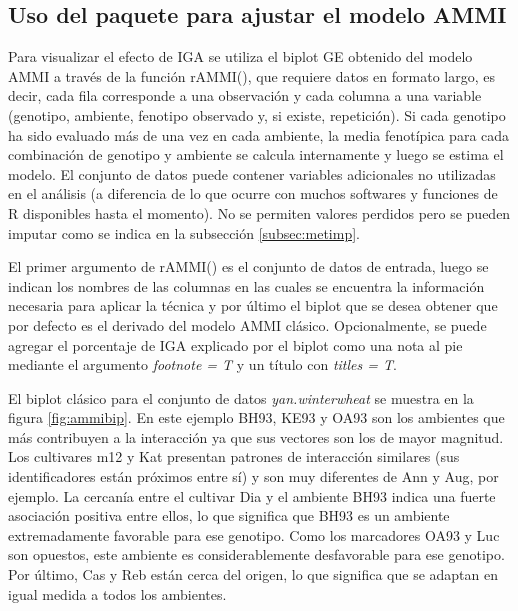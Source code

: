 \begin{itemize}[wide, nosep, labelindent = 0pt, topsep = 1ex, noitemsep,topsep=0pt]
\end{itemize}
   
  
\subsection{Uso del paquete para ajustar el modelo AMMI}

Para visualizar el efecto de IGA se utiliza el biplot GE obtenido del modelo AMMI a través de la función \textcolor{fandango}{rAMMI()}, que requiere datos en formato largo, es decir, cada fila corresponde a una observación y cada columna a una variable (genotipo, ambiente, fenotipo observado y, si existe, repetición). Si cada genotipo ha sido evaluado más de una vez en cada ambiente, la media fenotípica para cada combinación de genotipo y ambiente se calcula internamente y luego se estima el modelo. El conjunto de datos puede contener variables adicionales no utilizadas en el análisis (a diferencia de lo que ocurre con muchos softwares y funciones de R disponibles hasta el momento). No se permiten valores perdidos pero se pueden imputar como se indica en la subsección \ref{subsec:metimp}. 

El primer argumento de \textcolor{fandango}{rAMMI()} es el conjunto de datos de entrada, luego se indican los nombres de las columnas en las cuales se encuentra la información necesaria para aplicar la técnica y por último el biplot que se desea obtener que por defecto es el derivado del modelo AMMI clásico. Opcionalmente, se puede agregar el porcentaje de IGA explicado por el biplot como una nota al pie mediante el argumento \emph{footnote = T} y un título con \emph{titles = T}. 

El biplot clásico para el conjunto de datos \emph{yan.winterwheat} se muestra en la figura
\ref{fig:ammibip}. En este ejemplo BH93, KE93 y OA93 son los ambientes que más contribuyen a la interacción ya que sus vectores son los de mayor magnitud. Los cultivares m12 y Kat presentan patrones de interacción similares (sus identificadores están próximos entre sí) y son muy diferentes de Ann y Aug, por ejemplo. La cercanía entre el cultivar Dia y el ambiente BH93 indica una fuerte asociación positiva entre ellos, lo que significa que BH93 es un ambiente extremadamente favorable para ese genotipo. Como los marcadores OA93 y Luc son opuestos, este ambiente es considerablemente desfavorable para ese genotipo. Por último, Cas y Reb están cerca del origen, lo que significa que se adaptan en igual medida a todos los ambientes.

